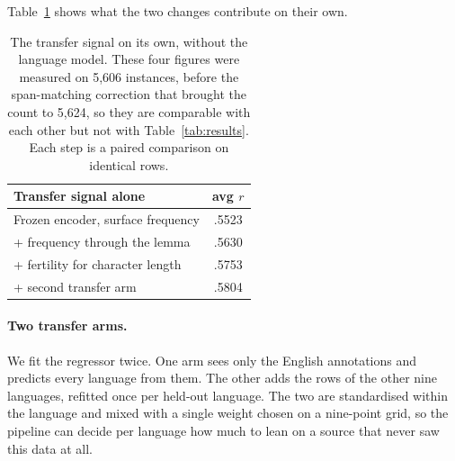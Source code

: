 Table~\ref{tab:aarm} shows what the two changes contribute on their own.

\begin{table}[t]
\centering
\small
\begin{tabular}{lc}
\toprule
Transfer signal alone & avg $r$ \\
\midrule
Frozen encoder, surface frequency      & .5523 \\
\quad + frequency through the lemma    & .5630 \\
\quad + fertility for character length & .5753 \\
\quad + second transfer arm            & .5804 \\
\bottomrule
\end{tabular}
\caption{The transfer signal on its own, without the language model.
These four figures were measured on 5{,}606 instances, before the
span-matching correction that brought the count to 5{,}624, so they are
comparable with each other but not with Table~\ref{tab:results}. Each
step is a paired comparison on identical rows.}
\label{tab:aarm}
\end{table}

\paragraph{Two transfer arms.} We fit the regressor twice. One arm sees
only the English annotations and predicts every language from them. The
other adds the rows of the other nine languages, refitted once per
held-out language. The two are standardised within the language and
mixed with a single weight chosen on a nine-point grid, so the pipeline
can decide per language how much to lean on a source that never saw this
data at all.

